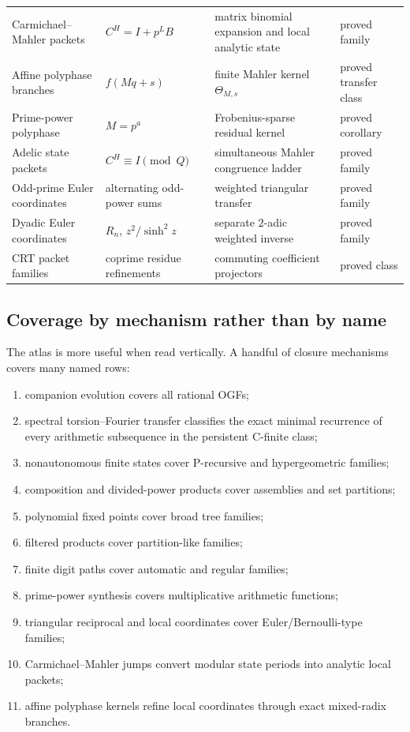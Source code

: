 \documentclass[11pt]{article}
\theoremstyle{definition}\newtheorem{definition}[theorem]{Definition}\newtheorem{example}[theorem]{Example}\newtheorem{construction}[theorem]{Construction}\newtheorem{algorithm}[theorem]{Algorithm}\newtheorem{conjecture}[theorem]{Conjecture}\newtheorem{problem}[theorem]{Problem}
\theoremstyle{remark}\newtheorem{remark}[theorem]{Remark}\newtheorem{boundary}[theorem]{Boundary}\newtheorem{certificate}[theorem]{Computational Certificate}\newtheorem{classical}[theorem]{Classical Input}\newtheorem{principle}[theorem]{Structural Principle}
\begin{document}
\begin{longtable}{L{.15\textwidth}L{.20\textwidth}L{.28\textwidth}L{.18\textwidth}}
Carmichael--Mahler packets&$C^H=I+p^LB$&matrix binomial expansion and local analytic state&proved family\\
Affine polyphase branches&$f(Mq+s)$&finite Mahler kernel $\Theta_{M,s}$&proved transfer class\\
Prime-power polyphase&$M=p^a$&Frobenius-sparse residual kernel&proved corollary\\
Adelic state packets&$C^H\equiv I\pmod Q$&simultaneous Mahler congruence ladder&proved family\\
Odd-prime Euler coordinates&alternating odd-power sums&weighted triangular transfer&proved family\\
Dyadic Euler coordinates&$R_n$, $z^2/\sinh^2z$&separate $2$-adic weighted inverse&proved family\\
CRT packet families&coprime residue refinements&commuting coefficient projectors&proved class\\
\bottomrule
\end{longtable}
\normalsize

\subsection{Coverage by mechanism rather than by name}
The atlas is more useful when read vertically.  A handful of closure mechanisms covers many named rows:
\begin{enumerate}
\item companion evolution covers all rational OGFs;
\item spectral torsion--Fourier transfer classifies the exact minimal recurrence of every arithmetic subsequence in the persistent C-finite class;
\item nonautonomous finite states cover P-recursive and hypergeometric families;
\item composition and divided-power products cover assemblies and set partitions;
\item polynomial fixed points cover broad tree families;
\item filtered products cover partition-like families;
\item finite digit paths cover automatic and regular families;
\item prime-power synthesis covers multiplicative arithmetic functions;
\item triangular reciprocal and local coordinates cover Euler/Bernoulli-type families;
\item Carmichael--Mahler jumps convert modular state periods into analytic local packets;
\item affine polyphase kernels refine local coordinates through exact mixed-radix branches.
\end{enumerate}
\end{document}
